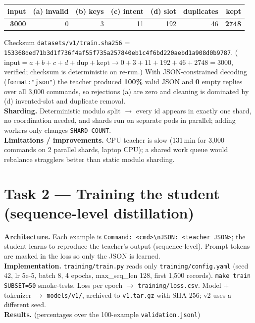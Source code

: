 \documentclass[10pt,a4paper]{article}
\newcommand{\code}[1]{\texttt{\small #1}}
\begin{document}
\begin{center}\small
\begin{tabular}{rrrrrrr}
\toprule
input & (a) invalid & (b) keys & (c) intent & (d) slot & duplicates & kept \\
\midrule
\textbf{3000} & 0 & 3 & 11 & 192 & 46 & \textbf{2748} \\
\bottomrule
\end{tabular}
\end{center}

\noindent Checksum \code{datasets/v1/train.sha256} = \code{153368ded71b3d1f736f4af55f735a257840eb1c4f6bd220aebd1a908d0b9787}.
($\text{input} = a+b+c+d+\text{dup}+\text{kept} \rightarrow 0+3+11+192+46+2748 = 3000$, verified; checksum is
deterministic on re-run.) With JSON-constrained decoding (\code{format:"json"}) the teacher produced
\textbf{100\%} valid JSON and \textbf{0} empty replies over all 3{,}000 commands, so rejections (a) are zero
and cleaning is dominated by (d) invented-slot and duplicate removal.\\
\textbf{Sharding.} Deterministic modulo split $\rightarrow$ every id appears in exactly one shard, no
coordination needed, and shards run on separate pods in parallel; adding workers only changes
\code{SHARD\_COUNT}.\\
\textbf{Limitations / improvements.} CPU teacher is slow (131\,min for 3{,}000 commands on 2 parallel
shards, laptop CPU); a shared work queue would rebalance stragglers better than static modulo sharding.

\section{Task 2 --- Training the student (sequence-level distillation)}
\textbf{Architecture.} Each example is \code{Command: <cmd>\textbackslash nJSON: <teacher JSON>}; the student
learns to reproduce the teacher's output (sequence-level). Prompt tokens are masked in the loss so only the
JSON is learned.\\
\textbf{Implementation.} \code{training/train.py} reads only \code{training/config.yaml} (seed 42, lr
5e-5, batch 8, 4 epochs, max\_seq\_len 128, first 1{,}500 records). \code{make train SUBSET=50} smoke-tests.
Loss per epoch $\rightarrow$ \code{training/loss.csv}. Model + tokenizer $\rightarrow$ \code{models/v1/},
archived to \code{v1.tar.gz} with SHA-256; v2 uses a different seed.\\
\textbf{Results.} (percentages over the 100-example \code{validation.jsonl})
\end{document}
